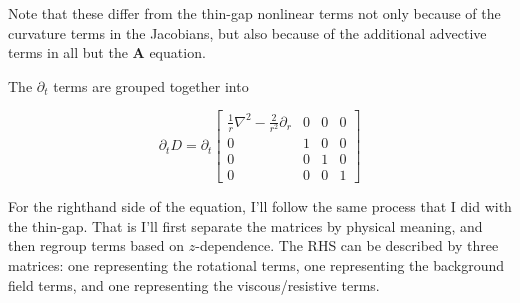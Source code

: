 \documentclass{paper}
\newcommand{\beq}{\begin{equation}}
\newcommand{\eeq}{\end{equation}}
\begin{document}
Note that these differ from the thin-gap nonlinear terms not only because of the curvature terms in the Jacobians, but also because of the additional advective terms in all but the $\mathbf{A}$ equation.

The $\partial_t$ terms are grouped together into 

\beq
\partial_t D = \partial_t \left[\begin{matrix}
\frac{1}{r}\nabla^2 - \frac{2}{r^2} \partial_r & 0 & 0 & 0\\
0 & 1 & 0 & 0\\
0 & 0 & 1 & 0\\
0 & 0 & 0 & 1
\end{matrix}\right]
\eeq

For the righthand side of the equation, I'll follow the same process that I did with the thin-gap. That is I'll first separate the matrices by physical meaning, and then regroup terms based on $z$-dependence. The RHS can be described by three matrices: one representing the rotational terms, one representing the background field terms, and one representing the viscous/resistive terms.
\end{document}
